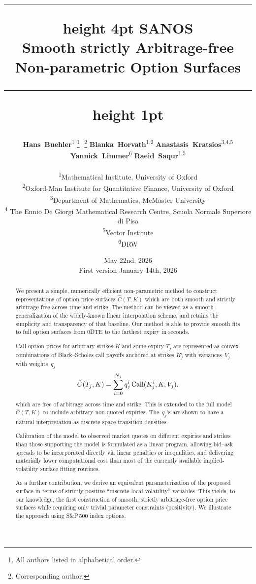 \documentclass[twoside]{article}
\title{
    \hrule height 4pt
    \vspace{0.25 in}
    {\Huge\bfseries SANOS} \\ [0.4em] 
    {\Large Smooth strictly Arbitrage-free Non-parametric Option Surfaces}
    \vspace{0.25in} 
    \hrule height 1pt
}
\author{%
  \hspace{-.18cm} 
  \textbf{Hans~Buehler}\textsuperscript{1}%
  \footnote{All authors listed in alphabetical order.}%
  \,\,\footnote{Corresponding author.}
  \quad
  \textbf{Blanka~Horvath}\textsuperscript{1,2} 
  \quad
  \textbf{Anastasis~Kratsios}\textsuperscript{3,4,5} 
  \\[0.5em] 
  \hspace{-.18cm} 
  \textbf{Yannick~Limmer}\textsuperscript{6}  
  \quad 
  \textbf{Raeid~Saqur}\textsuperscript{1,5}  \\[1em]
  \parbox{0.9\textwidth}{\centering\small
    \textsuperscript{1}Mathematical Institute, University of Oxford \\
    \textsuperscript{2}Oxford-Man Institute for Quantitative Finance, University of Oxford \\
    \textsuperscript{3}Department of Mathematics, McMaster University \\
    \textsuperscript{4} The Ennio De Giorgi Mathematical Research Centre, Scuola Normale Superiore di Pisa\\
    \textsuperscript{5}Vector Institute \\
    \textsuperscript{6}DRW
  }
}
\date{May 22nd, 2026{\small \\First version January 14th, 2026}}
\theoremstyle{plain}
\theoremstyle{definition}
\theoremstyle{remark}
\begin{document}



 \maketitle
\begin{abstract}
    
   We present a simple, numerically efficient non-parametric method to construct representations of option price surfaces
    $\hat C(T,K)$ which are both smooth and strictly arbitrage-free across time and strike. 
    The method can be viewed as a smooth generalization of the widely-known linear interpolation scheme, 
    and retains the simplicity and transparency of that baseline. Our method is able to provide smooth fits
    to full option surfaces from 0DTE to the farthest expiry in seconds.

Call option prices for arbitrary strikes $K$ and some expiry $T_j$ are represented as convex combinations of Black--Scholes call payoffs anchored at strikes $K^i_j$ with variances~$V_j$ 
with weights~$q_j$\vspace{-0.3cm}
$$
\vspace{-0.1cm}\hat C(T_j,K)=\sum_{i=0}^{N_j} q_j^i\,\mathrm{Call}(K^i_j,K,V_j).\vspace{-0.05cm}
$$ 
which are free of arbitrage across time and strike. This is extended to the full model $\hat C(T,K)$ to include arbitrary non-quoted expiries. The~$q_j$'s are shown  to have a natural interpretation as discrete space transition densities.

Calibration of the model to observed market quotes on different expiries and strikes than those supporting the model is formulated as a linear program, allowing bid--ask spreads to be incorporated directly via linear penalties or inequalities, and delivering materially lower computational cost than most of the currently available implied-volatility surface fitting routines.

As a further contribution, we derive an equivalent parameterization of the proposed surface in terms of strictly positive “discrete local volatility” \cite{DLV} variables. This yields, to our knowledge, the first construction of smooth, strictly arbitrage-free option price surfaces while requiring only trivial parameter constraints (positivity). We illustrate the approach using S\&P\,500 index options.
\end{abstract}
\end{document}
